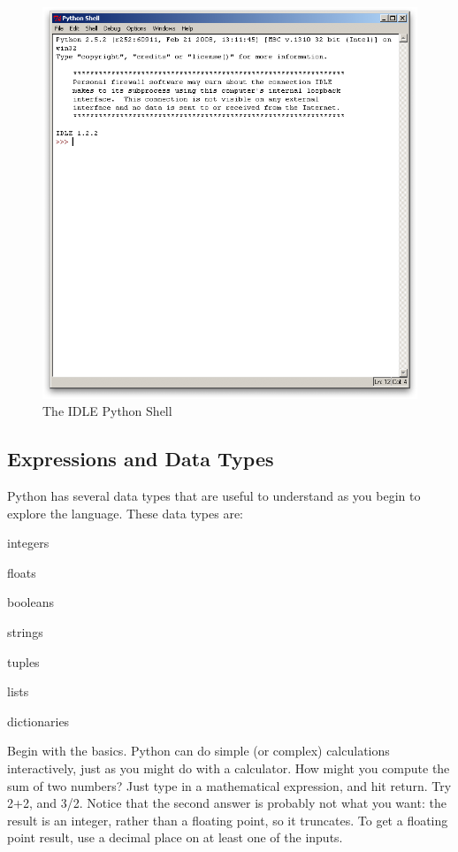 \begin{figure}[htp]
\begin{center}
\includegraphics[scale=0.4]{graphics/python-idle.png}
\end{center}
\caption{The IDLE Python Shell}
\label{fig:python-idle}
\end{figure}

\subsection{Expressions and Data Types}

Python has several data types that are useful to understand as you begin to explore the language.  These data types are:

\squishlist
\item integers
\item floats
\item booleans
\item strings
\item tuples
\item lists
\item dictionaries
\squishend

Begin with the basics.  Python can do simple (or complex) calculations interactively, just as you might do with a calculator.  How might you compute the sum of two numbers?  Just type in a mathematical expression, and hit return.  Try 2+2, and 3/2.  Notice that the second answer is probably not what you want: the result is an integer, rather than a floating point, so it truncates.  To get a floating point result, use a decimal place on at least one of the inputs.\\

